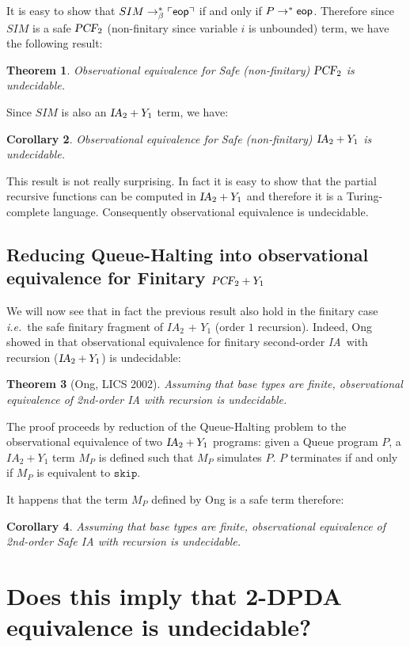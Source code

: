 \documentclass{article}
\newtheorem{theorem}{Theorem}[section]
\newtheorem{corollary}[theorem]{Corollary}
\newcommand{\encode}[1]{\ulcorner #1 \urcorner}
\newcommand\eop{{\sf eop}}
\newcommand{\betared}{\rightarrow_\beta}
\newcommand\ialgol{{\textsl{IA}}}
\newcommand\pcf{\textsl{PCF}}
\newcommand\iaskip{\texttt{skip}}
\begin{document}
It is easy to show that $SIM \betared^* \encode{\eop}$ if and only if $P \rightarrow^* \eop$. Therefore since $SIM$ is a safe $\pcf_2$
(non-finitary since variable $i$ is unbounded) term, we have the following result:
\begin{theorem}
Observational equivalence for Safe (non-finitary) $\pcf_2$ is undecidable.
\end{theorem}
Since $SIM$ is also an $\ialgol_2 + Y_1$ term, we have:
\begin{corollary}
Observational equivalence for Safe (non-finitary) $\ialgol_2 + Y_1$ is undecidable.
\end{corollary}

This result is not really surprising. In fact it is easy to show that the partial recursive functions can be computed in $\ialgol_2 + Y_1$ and therefore it is a Turing-complete language. Consequently observational equivalence is undecidable.


\subsection{Reducing Queue-Halting into observational equivalence for Finitary $\pcf_2 + Y_1$}

We will now see that in fact the previous result also hold in the
finitary case {\it i.e.}~the safe finitary fragment of $IA_2$ +
$Y_1$ (order $1$ recursion). Indeed, Ong showed in \cite{Ong02} that
observational equivalence for finitary second-order \ialgol\ with
recursion ($\ialgol_2 + Y_1$) is undecidable:
\begin{theorem}[Ong, LICS 2002]
Assuming that base types are finite, observational equivalence of 2nd-order IA with recursion is undecidable.
\end{theorem}

The proof proceeds by reduction of the Queue-Halting problem to the
observational equivalence of two $\ialgol_2 + Y_1$ programs: given a
Queue program $P$, a $IA_2 + Y_1$ term $M_P$ is defined such that
$M_P$ simulates $P$. $P$ terminates if and only if $M_P$ is
equivalent to $\iaskip$.

It happens that the term $M_P$ defined by Ong is a safe term
therefore:
\begin{corollary}
Assuming that base types are finite, observational equivalence of 2nd-order Safe IA with recursion is undecidable.
\end{corollary}

\section{Does this imply that 2-DPDA equivalence is undecidable?}
\end{document}
